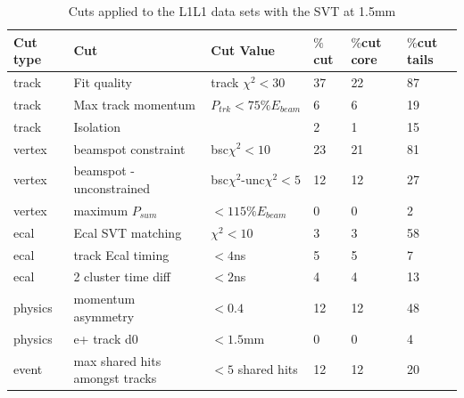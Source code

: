 \begin{table}[htb]
\caption{Cuts applied to the L1L1 data sets with the SVT at 1.5mm}
\label{l1l1_cuts_1p5}
\centering
\begin{tabular}{llllll}
\toprule
Cut type & Cut & Cut Value &  $\%$cut &  $\%$cut core & $\%$cut tails\\
\midrule
track & Fit quality & track $\chi^{2}<30$ & 37 & 22 & 87 \\
track & Max track momentum &  $P_{trk}<75\%E_{beam}$ & 6 & 6 & 19 \\
track & Isolation &   & 2 & 1 & 15 \\
vertex & beamspot constraint & bsc$\chi^{2}<10$  & 23 & 21 & 81 \\
vertex & beamspot - unconstrained & bsc$\chi^{2}$-unc$\chi^2<5$  & 12 & 12 & 27 \\
vertex & maximum $P_{sum}$ &  $<115\%E_{beam}$ & 0 & 0 & 2 \\
ecal & Ecal SVT matching & $\chi^2<10$  & 3 & 3 & 58 \\
ecal & track Ecal timing & $<4$ns  & 5 & 5 & 7 \\
ecal & 2 cluster time diff & $<2$ns  & 4 & 4 & 13 \\
physics & momentum asymmetry & $<0.4$  & 12 & 12 & 48 \\
physics & e+ track d0 & $<1.5$mm  & 0 & 0 & 4 \\
event & max shared hits amongst tracks & $<5$ shared hits  & 12 & 12 & 20 \\
\bottomrule
\end{tabular}
\end{table}


